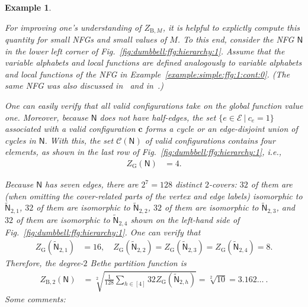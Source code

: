 \documentclass[journal, twocolumn]{IEEEtran}
\renewcommand{\mathbf}[1]{{\bm{#1}}}
\newcommand{\ie}{\emph{i.e.}}
\newcommand{\vect}[1]{\mathbf{#1}}
\newcommand{\set}[1]{\mathcal{#1}}
\newcommand{\graph}[1]{\mathsf{#1}}
\newcommand{\setC}{\set{C}}
\newcommand{\setE}{\set{E}}
\newcommand{\vc}{\vect{c}}
\newcommand{\graphN}{\graph{N}}
\newcommand{\ZBetheM}[1]{Z_{\mathrm{B}, #1}}
\newcommand{\cover}[1]{\tilde{#1}}
\newcommand{\cgraph}[1]{\cover{\graph{#1}}}
\newcommand{\?}{\mathrm{?}}
\newcommand{\ZGibbs}{Z_{\mathrm{G}}}
\newtheorem{Example}[Lemma]{Example}
\begin{document}
\begin{Example}
  \label{example:dumbbell:ffg:1}

  For improving one's understanding of $\ZBetheM{M}$, it is helpful to
  explictly compute this quantity for small NFGs and small values of $M$. To
  this end, consider the NFG $\graphN$ in the lower left corner of
  Fig.~\ref{fig:dumbbell:ffg:hierarchy:1}. Assume that the variable alphabets
  and local functions are defined analogously to variable alphabets and local
  functions of the NFG in Example~\ref{example:simple:ffg:1:cont:0}.  (The
  same NFG was also discussed in~\cite[Example~29]{Vontobel:Koetter:05:1:subm}
  and in~\cite[Example~2.4]{Koetter:Li:Vontobel:Walker:07:1}.)

  One can easily verify that all valid configurations take on the global
  function value one. Moreover, because $\graphN$ does not have half-edges,
  the set $\{ e \! \in \! \setE \ | \ c_e \! = \! 1 \}$ associated with a
  valid configuration $\vc$ forms a cycle or an edge-disjoint union of cycles
  in $\graphN$. With this, the set $\setC(\graphN)$ of valid configurations
  contains four elements, as shown in the last row of
  Fig.~\ref{fig:dumbbell:ffg:hierarchy:1}, \ie,
  \begin{align*}
    \ZGibbs(\graphN)
      &= 4.
  \end{align*}

  Because $\graphN$ has seven edges, there are $2^7 = 128$ distinct
  $2$-covers: $32$ of them are (when omitting the cover-related parts of the
  vertex and edge labels) isomorphic to $\cgraph{N}_{2,1}$, $32$ of them are
  isomorphic to $\cgraph{N}_{2,2}$, $32$ of them are isomorphic to
  $\cgraph{N}_{2,3}$, and $32$ of them are isomorphic to $\cgraph{N}_{2,4}$
  shown on the left-hand side of Fig.~\ref{fig:dumbbell:ffg:hierarchy:1}. One
  can verify that
  \begin{align*}
    \ZGibbs(\cgraph{N}_{2,1})
      &= 16, \quad
    \ZGibbs(\cgraph{N}_{2,2})
       = \ZGibbs(\cgraph{N}_{2,3})
       = \ZGibbs(\cgraph{N}_{2,4})
       = 8.
  \end{align*}
  Therefore, the degree-$2$ Bethe partition function is
  \begin{align*}
    \ZBetheM{2}(\graphN)
      &= \sqrt[2]{\frac{1}{128}
                  \sum_{h \in [4]}
                    32 \ZGibbs(\cgraph{N}_{2,h})
                 }
       = \sqrt[2]{10}
       = 3.162 \ldots \ .
  \end{align*}
  Some comments:
  \begin{itemize}
 

\end{itemize}
\end{Example}
\end{document}
